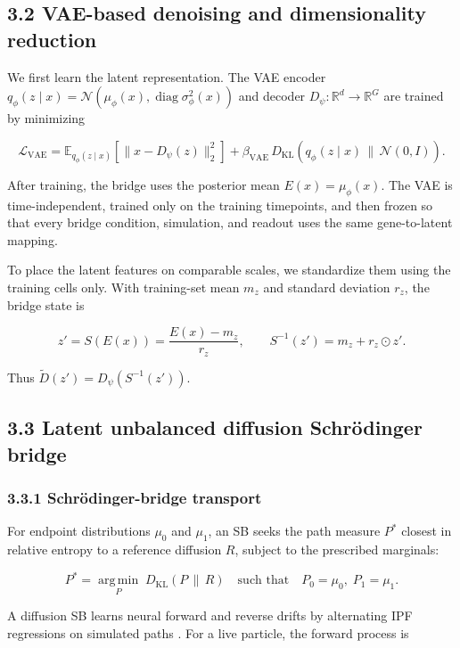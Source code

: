 \documentclass[
  11pt,
  letterpaper,
]{article}
\begin{document}
\subsection{3.2 VAE-based denoising and dimensionality
reduction}\label{vae-based-denoising-and-dimensionality-reduction}

We first learn the latent representation. The VAE encoder
\(q_\phi(z\mid x)=\mathcal{N}(\mu_\phi(x),\operatorname{diag}\sigma_\phi^2(x))\)
and decoder \(D_\psi:\mathbb{R}^{d}\rightarrow\mathbb{R}^{G}\) are
trained by minimizing

\[
\mathcal{L}_{\mathrm{VAE}}
=\mathbb{E}_{q_\phi(z\mid x)}\!\left[\lVert x-D_\psi(z)\rVert_2^2\right]
+\beta_{\mathrm{VAE}}\,D_{\mathrm{KL}}\!\left(q_\phi(z\mid x)\,\|\,\mathcal{N}(0,I)\right).
\]

After training, the bridge uses the posterior mean
\(E(x)=\mu_\phi(x)\). The VAE is time-independent, trained only on the
training timepoints, and then frozen so that every bridge condition,
simulation, and readout uses the same gene-to-latent mapping.

To place the latent features on comparable scales, we standardize them
using the training cells only. With training-set mean \(m_z\) and
standard deviation \(r_z\), the bridge state is

\[
z'=S(E(x))=\frac{E(x)-m_z}{r_z},
\qquad
S^{-1}(z')=m_z+r_z\odot z'.
\]

Thus \(\widetilde D(z')=D_\psi(S^{-1}(z'))\).

\subsection{3.3 Latent unbalanced diffusion Schrödinger
bridge}\label{latent-unbalanced-diffusion-schruxf6dinger-bridge}

\subsubsection{3.3.1 Schrödinger-bridge
transport}\label{schruxf6dinger-bridge-transport}

For endpoint distributions \(\mu_0\) and \(\mu_1\), an SB seeks the path
measure \(P^*\) closest in relative entropy to a reference diffusion
\(R\), subject to the prescribed marginals:

\[
P^*=\operatorname*{arg\,min}_{P}\;D_{\mathrm{KL}}(P\,\|\,R)
\quad\text{such that}\quad P_0=\mu_0,\;P_1=\mu_1.
\]

A diffusion SB learns neural forward and reverse drifts by alternating
IPF regressions on simulated paths \parencite{de_bortoli_diffusion_2021}. For a live
particle, the forward process is
\end{document}
